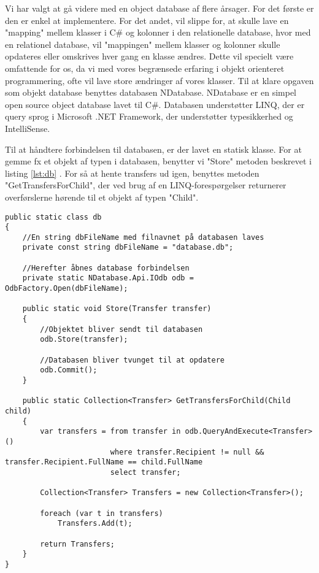 Vi har valgt at gå videre med en object database af flere årsager. For det første er den er enkel at implementere. For det andet, vil slippe for, at skulle lave en "mapping" mellem klasser i C\# og kolonner i den relationelle database, hvor med en relationel database, vil "mappingen" mellem klasser og kolonner skulle opdateres eller omskrives hver gang en klasse ændres. Dette vil specielt være omfattende for os, da vi med vores begrænsede erfaring i objekt orienteret programmering, ofte vil lave store ændringer af vores klasser.
Til at klare opgaven som objekt database benyttes databasen NDatabase. NDatabase er en simpel open source object database lavet til C\#. Databasen understøtter LINQ, der er query sprog i Microsoft .NET Framework, der understøtter typesikkerhed og IntelliSense\cite{linqdok}.

Til at håndtere forbindelsen til databasen, er der lavet en statisk klasse. For at gemme fx et objekt af typen  i databasen, benytter vi "Store" metoden beskrevet i listing \ref{lst:db} . For så at hente transfers ud igen, benyttes metoden "GetTransfersForChild", der ved brug af en LINQ-forespørgelser returnerer overførslerne hørende til et objekt af typen "Child".
\\

\begin{lstlisting}[caption={Uddrag af filen "db.cs" fra kildekoden til programmet},label={lst:db}]
public static class db
{
	//En string dbFileName med filnavnet på databasen laves
	private const string dbFileName = "database.db";
	
	//Herefter åbnes database forbindelsen
	private static NDatabase.Api.IOdb odb = OdbFactory.Open(dbFileName);

	public static void Store(Transfer transfer)
	{
		//Objektet bliver sendt til databasen
		odb.Store(transfer);
		
		//Databasen bliver tvunget til at opdatere
		odb.Commit();
	}
	
	public static Collection<Transfer> GetTransfersForChild(Child child)
	{
		var transfers = from transfer in odb.QueryAndExecute<Transfer>()
						where transfer.Recipient != null && transfer.Recipient.FullName == child.FullName
						select transfer;

		Collection<Transfer> Transfers = new Collection<Transfer>();

		foreach (var t in transfers)
			Transfers.Add(t);

		return Transfers;
	}
}
\end{lstlisting}